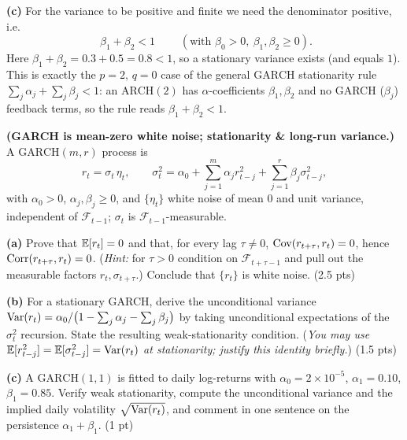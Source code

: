 \documentclass[11pt]{article}
\newcommand{\F}{\mathcal{F}}
\begin{document}
\textbf{(c)} For the variance to be positive and finite we need the denominator positive, i.e.
\[
\boxed{\;\beta_1+\beta_2<1\;}\qquad(\text{with }\beta_0>0,\ \beta_1,\beta_2\ge0).
\]
Here $\beta_1+\beta_2=0.3+0.5=0.8<1$, so a stationary variance exists (and equals $1$). This is exactly the $p=2,\,q=0$ case of the general $\mathrm{GARCH}$ stationarity rule $\sum_{j}\alpha_j+\sum_{j}\beta_j<1$: an $\mathrm{ARCH}(2)$ has $\alpha$-coefficients $\beta_1,\beta_2$ and no GARCH ($\beta_j$) feedback terms, so the rule reads $\beta_1+\beta_2<1$.

\statementstart
\textbf{(GARCH is mean-zero white noise; stationarity \& long-run variance.)} A $\mathrm{GARCH}(m,r)$ process is
\[
r_t=\sigma_t\,\eta_t ,\qquad
\sigma_t^2=\alpha_0+\sum_{j=1}^{m}\alpha_j r_{t-j}^2+\sum_{j=1}^{r}\beta_j\sigma_{t-j}^2 ,
\]
with $\alpha_0>0$, $\alpha_j,\beta_j\ge0$, and $\{\eta_t\}$ white noise of mean $0$ and unit variance, independent of $\F_{t-1}$; $\sigma_t$ is $\F_{t-1}$-measurable.

\textbf{(a)} Prove that $\mathbb{E}[r_t]=0$ and that, for every lag $\tau\neq0$, $\operatorname{Cov}(r_{t+\tau},r_t)=0$, hence $\operatorname{Corr}(r_{t+\tau},r_t)=0$. (\emph{Hint:} for $\tau>0$ condition on $\F_{t+\tau-1}$ and pull out the measurable factors $r_t,\sigma_{t+\tau}$.) Conclude that $\{r_t\}$ is white noise. \hfill(2.5 pts)

\textbf{(b)} For a stationary GARCH, derive the unconditional variance
$\operatorname{Var}(r_t)=\alpha_0/\bigl(1-\sum_{j}\alpha_j-\sum_{j}\beta_j\bigr)$ by taking unconditional expectations of the $\sigma_t^2$ recursion. State the resulting weak-stationarity condition. (\emph{You may use $\mathbb{E}[r_{t-j}^2]=\mathbb{E}[\sigma_{t-j}^2]=\operatorname{Var}(r_t)$ at stationarity; justify this identity briefly.}) \hfill(1.5 pts)

\textbf{(c)} A $\mathrm{GARCH}(1,1)$ is fitted to daily log-returns with $\alpha_0=2\times10^{-5}$, $\alpha_1=0.10$, $\beta_1=0.85$. Verify weak stationarity, compute the unconditional variance and the implied daily volatility $\sqrt{\operatorname{Var}(r_t)}$, and comment in one sentence on the persistence $\alpha_1+\beta_1$. \hfill(1 pt)
\statementend
\end{document}
